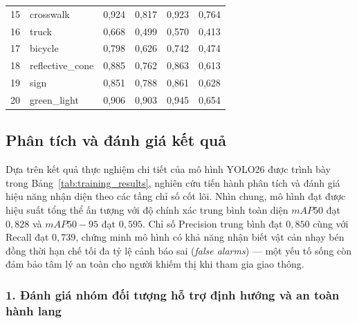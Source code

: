\begin{table}[h!]
\begin{tabular}{llcccc}
        15 & crosswalk              & 0,924          & 0,817          & 0,923          & 0,764          \\
        16 & truck                  & 0,668          & 0,499          & 0,570          & 0,413          \\
        17 & bicycle                & 0,798          & 0,626          & 0,742          & 0,474          \\
        18 & reflective\_cone       & 0,885          & 0,762          & 0,863          & 0,613          \\
        19 & sign                   & 0,851          & 0,788          & 0,861          & 0,628          \\
        20 & green\_light           & 0,906          & 0,903          & 0,945          & 0,654          \\
        \bottomrule
    \end{tabular}
\end{table}

\subsection{Phân tích và đánh giá kết quả}

Dựa trên kết quả thực nghiệm chi tiết của mô hình YOLO26 được trình bày trong Bảng~\ref{tab:training_results}, nghiên cứu tiến hành phân tích và đánh giá hiệu năng nhận diện theo các tầng chỉ số cốt lõi. Nhìn chung, mô hình đạt được hiệu suất tổng thể ấn tượng với độ chính xác trung bình toàn diện $mAP50$ đạt $0,828$ và $mAP50-95$ đạt $0,595$. Chỉ số Precision trung bình đạt $0,850$ cùng với Recall đạt $0,739$, chứng minh mô hình có khả năng nhận biết vật cản nhạy bén đồng thời hạn chế tối đa tỷ lệ cảnh báo sai (\textit{false alarms}) — một yếu tố sống còn đảm bảo tâm lý an toàn cho người khiếm thị khi tham gia giao thông.

\subsubsection*{1. Đánh giá nhóm đối tượng hỗ trợ định hướng và an toàn hành lang}

